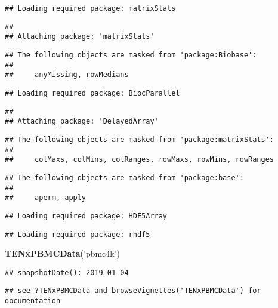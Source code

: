 \documentclass[]{book}
\newenvironment{Shaded}{\begin{snugshade}}{\end{snugshade}}
\newcommand{\KeywordTok}[1]{\textcolor[rgb]{0.13,0.29,0.53}{\textbf{#1}}}
\newcommand{\NormalTok}[1]{#1}
\newcommand{\StringTok}[1]{\textcolor[rgb]{0.31,0.60,0.02}{#1}}
\begin{document}
\begin{verbatim}
## Loading required package: matrixStats
\end{verbatim}

\begin{verbatim}
## 
## Attaching package: 'matrixStats'
\end{verbatim}

\begin{verbatim}
## The following objects are masked from 'package:Biobase':
## 
##     anyMissing, rowMedians
\end{verbatim}

\begin{verbatim}
## Loading required package: BiocParallel
\end{verbatim}

\begin{verbatim}
## 
## Attaching package: 'DelayedArray'
\end{verbatim}

\begin{verbatim}
## The following objects are masked from 'package:matrixStats':
## 
##     colMaxs, colMins, colRanges, rowMaxs, rowMins, rowRanges
\end{verbatim}

\begin{verbatim}
## The following objects are masked from 'package:base':
## 
##     aperm, apply
\end{verbatim}

\begin{verbatim}
## Loading required package: HDF5Array
\end{verbatim}

\begin{verbatim}
## Loading required package: rhdf5
\end{verbatim}

\begin{Shaded}
\begin{Highlighting}[]
\KeywordTok{TENxPBMCData}\NormalTok{(}\StringTok{'pbmc4k'}\NormalTok{)}
\end{Highlighting}
\end{Shaded}

\begin{verbatim}
## snapshotDate(): 2019-01-04
\end{verbatim}

\begin{verbatim}
## see ?TENxPBMCData and browseVignettes('TENxPBMCData') for documentation
\end{verbatim}
\end{document}

